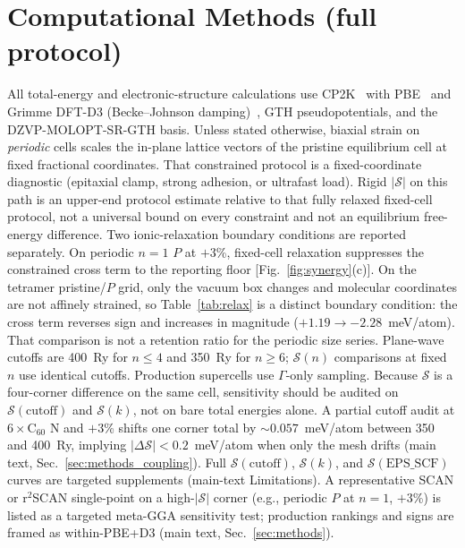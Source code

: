 \section*{Computational Methods (full protocol)}

All total-energy and electronic-structure calculations use CP2K~\cite{VandeVondele2005quickstep} with PBE~\cite{Perdew1996generalized} and Grimme DFT-D3 (Becke--Johnson damping)~\cite{Grimme2011effect}, GTH pseudopotentials, and the DZVP-MOLOPT-SR-GTH basis.
Unless stated otherwise, biaxial strain on \emph{periodic} cells scales the in-plane lattice vectors of the pristine equilibrium cell at fixed fractional coordinates. That constrained protocol is a fixed-coordinate diagnostic (epitaxial clamp, strong adhesion, or ultrafast load). Rigid $|\mathcal{S}|$ on this path is an upper-end protocol estimate relative to that fully relaxed fixed-cell protocol, not a universal bound on every constraint and not an equilibrium free-energy difference.
Two ionic-relaxation boundary conditions are reported separately. On periodic $n{=}1$ $P$ at $+3$\%, fixed-cell relaxation suppresses the constrained cross term to the reporting floor [Fig.~\ref{fig:synergy}(c)]. On the tetramer pristine/$P$ grid, only the vacuum box changes and molecular coordinates are not affinely strained, so Table~\ref{tab:relax} is a distinct boundary condition: the cross term reverses sign and increases in magnitude ($+1.19\to-2.28$~meV/atom). That comparison is not a retention ratio for the periodic size series.
Plane-wave cutoffs are 400~Ry for $n\leq 4$ and 350~Ry for $n\geq 6$; $\mathcal{S}(n)$ comparisons at fixed $n$ use identical cutoffs.
Production supercells use $\Gamma$-only sampling.
Because $\mathcal{S}$ is a four-corner difference on the same cell, sensitivity should be audited on $\mathcal{S}(\mathrm{cutoff})$ and $\mathcal{S}(k)$, not on bare total energies alone.
A partial cutoff audit at $6\times\mathrm{C}_{60}$ N and $+3$\% shifts one corner total by ${\sim}0.057$~meV/atom between 350 and 400~Ry, implying $|\Delta\mathcal{S}|<0.2$~meV/atom when only the mesh drifts (main text, Sec.~\ref{sec:methods_coupling}).
Full $\mathcal{S}(\mathrm{cutoff})$, $\mathcal{S}(k)$, and $\mathcal{S}(\mathrm{EPS\_SCF})$ curves are targeted supplements (main-text Limitations).
A representative SCAN or r$^2$SCAN single-point on a high-$|\mathcal{S}|$ corner (e.g., periodic $P$ at $n{=}1$, $+3$\%) is listed as a targeted meta-GGA sensitivity test; production rankings and signs are framed as within-PBE+D3 (main text, Sec.~\ref{sec:methods}).

